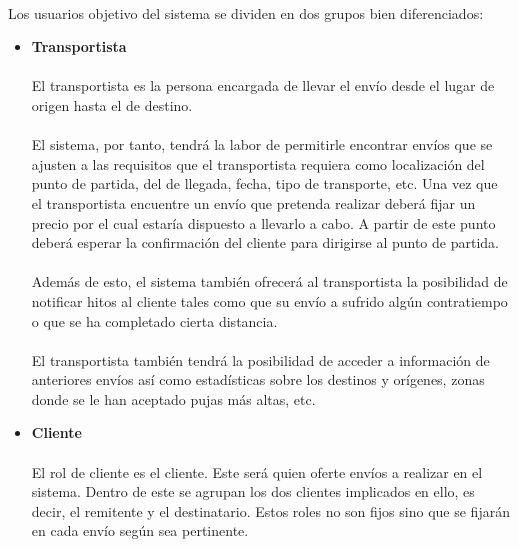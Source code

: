 \documentclass[10pt, a4paper,spanish]{article}
\begin{document}
		\paragraph{}
		Los usuarios objetivo del sistema se dividen en dos grupos bien diferenciados:

		\begin{itemize}


			\item{\textbf{Transportista}}

			\paragraph{}
			El transportista es la persona encargada de llevar el envío desde el lugar de origen hasta el de destino.

			\paragraph{}
			El sistema, por tanto, tendrá la labor de permitirle encontrar envíos que se ajusten a las requisitos que el transportista requiera como localización del punto de partida, del de llegada, fecha, tipo de transporte, etc. Una vez que el transportista encuentre un envío que pretenda realizar deberá fijar un precio por el cual estaría dispuesto a llevarlo a cabo. A partir de este punto deberá esperar la confirmación del cliente para dirigirse al punto de partida.

			\paragraph{}
			Además de esto, el sistema también ofrecerá al transportista la posibilidad de notificar hitos al cliente tales como que su envío a sufrido algún contratiempo o que se ha completado cierta distancia.

			\paragraph{}
			El transportista también tendrá la posibilidad de acceder a información de anteriores envíos así como estadísticas sobre los destinos y orígenes, zonas donde se le han aceptado pujas más altas, etc.


			\item{\textbf{Cliente}}
			\paragraph{}
			El rol de cliente es el cliente. Este será quien oferte envíos a realizar en el sistema. Dentro de este se agrupan los dos clientes implicados en ello, es decir, el remitente y el destinatario. Estos roles no son fijos sino que se fijarán en cada envío según sea pertinente.


\end{itemize}
\end{document}
